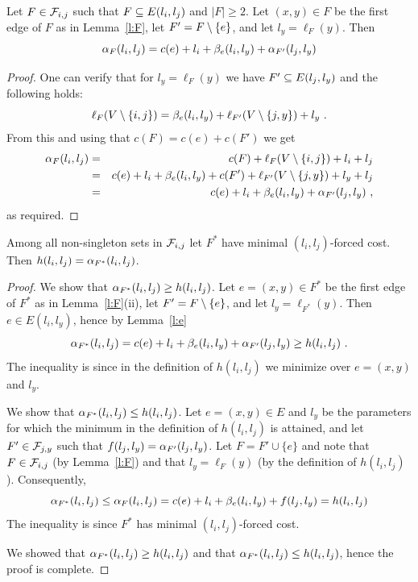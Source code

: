 \documentclass[a4paper,UKenglish,autoref]{lipics-v2019}
\begin{document}
\begin{lemma} \label{l:e}
Let $F \in {\cal F}_{i,j}$ such that $F \subseteq E(l_i,l_j)$ and $|F| \geq 2$.
Let $(x,y) \in F$ be the first edge of $F$ as in Lemma~\ref{l:F}, let $F'=F \setminus \{e\}$, and let $l_y=\ell_F(y)$. 
Then 
\[
\alpha_F(l_i,l_j) =c(e)+l_i+\beta_e(l_i,l_y)+\alpha_{F'}(l_j,l_y)
\]
\end{lemma}
\begin{proof}
One can verify that for $l_y=\ell_F(y)$ we have $F' \subseteq E(l_j,l_y)$ and the following holds:
\[
 \ell_F(V \setminus \{i,j\}) = \beta_e(l_i,l_y)+\ell_{F'}(V \setminus \{j,y\})+l_y  \ .
\]
From this and using that $c(F)=c(e)+c(F')$ we get 
\begin{eqnarray*}
\alpha_F(l_i,l_j) & = & c(F)+\ell_F(V \setminus \{i,j\})+l_i+l_j  \\
                     & = & c(e)+l_i+\beta_e(l_i,l_y)+c(F')+\ell_{F'}(V \setminus \{j,y\})+l_y+l_j  \\
										 & = & c(e)+l_i+\beta_e(l_i,l_y)+\alpha_{F'}(l_j,l_y) \ , 
\end{eqnarray*}
as required.
\end{proof}


\begin{lemma} \label{l:F*}
Among all non-singleton sets in ${\cal F}_{i,j}$ let $F^*$ have minimal $(l_i,l_j)$-forced cost.
Then $h(l_i,l_j)=\alpha_{F^*}(l_i,l_j)$.
\end{lemma}
\begin{proof}
We show that $\alpha_{F^*}(l_i,l_j) \geq h(l_i,l_j)$. 
Let $e=(x,y) \in F^*$ be the first edge of $F^*$ as in Lemma~\ref{l:F}(ii), let $F'=F \setminus \{e\}$, and let $l_y=\ell_{F^*}(y)$. 
Then $e \in E(l_i,l_y)$, hence by Lemma~\ref{l:e}
\[
\alpha_{F^*}(l_i,l_j) = c(e)+l_i+\beta_e(l_i,l_y)+\alpha_{F'}(l_j,l_y) \geq h(l_i,l_j) \ .
\]
The inequality is since in the definition of $h(l_i,l_j)$ we minimize over $e=(x,y)$ and $l_y$. 

We show that $\alpha_{F^*}(l_i,l_j) \leq h(l_i,l_j)$. 
Let $e=(x,y) \in E$ and $l_y$ be the parameters for which 
the minimum in the definition of $h(l_i,l_j)$ is attained, 
and let $F' \in {\cal F}_{j,y}$ such that $f(l_j,l_y) = \alpha_{F'}(l_j,l_y)$.
Let $F=F' \cup \{e\}$ and note that $F \in {\cal F}_{i,j}$ (by Lemma~\ref{l:F}) and that $l_y=\ell_F(y)$ (by the definition of $h(l_i,l_j)$). 
Consequently, 
\[
 \alpha_{F^*}(l_i,l_j) \leq  \alpha_F(l_i,l_j) = c(e)+l_i+\beta_e(l_i,l_y)+f(l_j,l_y) = h(l_i,l_j) 
\]
The inequality is since $F^*$ has minimal $(l_i,l_j)$-forced cost. 

We showed that $\alpha_{F^*}(l_i,l_j) \geq h(l_i,l_j)$ and that $\alpha_{F^*}(l_i,l_j) \leq h(l_i,l_j)$,
hence the proof is complete. 
\end{proof}
\end{document}
